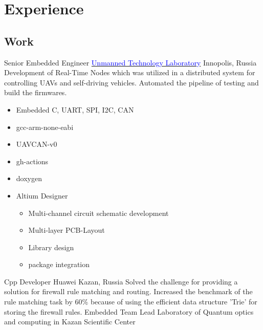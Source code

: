 \section{Experience}

\vspace{2mm}
\subsection{\Large{Work}}

        {Senior Embedded Engineer}
        {\href{https://robotics.innopolis.university/en/labs/laboratoriya-bespilotnyh-technologyi/}{\textcolor{blue}{Unmanned Technology Laboratory}}}
        {Innopolis, Russia}
        {
        \newline
        Development of Real-Time Nodes which was utilized in a distributed system for controlling UAVs and self-driving vehicles. Automated the pipeline of testing and build the firmwares.
        } 
        {
        \begin{itemize}
            \item Embedded C, UART, SPI, I2C, CAN
            \item gcc-arm-none-eabi
            \item UAVCAN-v0
            \item gh-actions
            \item doxygen
            \item Altium Designer \begin{itemize}
                \item Multi-channel circuit schematic development
                \item Multi-layer PCB-Layout
                \item Library design
                \item package integration
            \end{itemize}
        \end{itemize}
        }
        {Cpp Developer}
        {Huawei}
        {Kazan, Russia}
        {
        \newline
        Solved the challenge for providing a solution for firewall rule matching and routing. 
        Increased the benchmark of the rule matching task by 60\% because of using the efficient data structure 'Trie' for storing the firewall rules. 
        }
        {}
        {Embedded Team Lead}
        {Laboratory of Quantum optics and  computing  in  Kazan Scientific Center}
